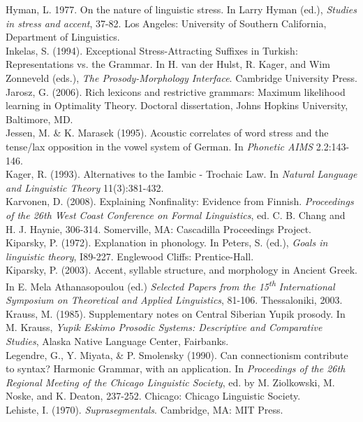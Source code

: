 \documentclass[a4paper]{article}
\begin{document}
Hyman, L. 1977. On the nature of linguistic stress. In Larry Hyman (ed.), \textit{Studies in stress and accent}, 37-82. Los Angeles: University of Southern California, Department of Linguistics.\\\noindent
Inkelas, S. (1994). Exceptional Stress-Attracting Suffixes in Turkish: Representations vs. the Grammar. In H. van der Hulst, R. Kager, and Wim Zonneveld (eds.),\textit{ The Prosody-Morphology Interface}. Cambridge University Press.\\\noindent
Jarosz, G. (2006). Rich lexicons and restrictive grammars: Maximum likelihood learning in Optimality Theory. Doctoral dissertation, Johns Hopkins University, Baltimore, MD.\\\noindent
Jessen, M. \& K. Marasek (1995). Acoustic correlates of word stress and the tense/lax opposition in the vowel system of German. In \textit{Phonetic AIMS} 2.2:143-146.\\\noindent
Kager, R. (1993). Alternatives to the Iambic - Trochaic Law. In \textit{Natural Language and Linguistic Theory} 11(3):381-432.\\\noindent
Karvonen, D. (2008). Explaining Nonfinality: Evidence from Finnish. \textit{Proceedings of the 26th West Coast Conference on Formal Linguistics}, ed. C. B. Chang and H. J. Haynie, 306-314. Somerville, MA: Cascadilla Proceedings Project.\\\noindent
Kiparsky, P. (1972). Explanation in phonology. In Peters, S. (ed.), \textit{Goals in linguistic theory}, I89-227. Englewood Cliffs: Prentice-Hall.\\\noindent
Kiparsky, P. (2003). Accent, syllable structure, and morphology in Ancient Greek. In E. Mela Athanasopoulou (ed.) \textit{Selected Papers from the 15}\textit{\textsuperscript{th }}\textit{International Symposium on Theoretical and Applied Linguistics}, 81-106. Thessaloniki, 2003.\\\noindent
Krauss, M. (1985). Supplementary notes on Central Siberian Yupik prosody. In M. Krauss, \textit{Yupik Eskimo Prosodic Systems: Descriptive and Comparative Studies}, Alaska Native Language Center, Fairbanks.\\\noindent
Legendre, G., Y. Miyata, \& P. Smolensky (1990). Can connectionism contribute to syntax? Harmonic Grammar, with an application. In \textit{Proceedings of the 26th Regional Meeting of the Chicago Linguistic Society}, ed. by M. Ziolkowski, M. Noske, and K. Deaton, 237-252. Chicago: Chicago Linguistic Society.\\\noindent
Lehiste, I. (1970). \textit{Suprasegmentals}. Cambridge, MA: MIT Press.\\\noindent
\end{document}
